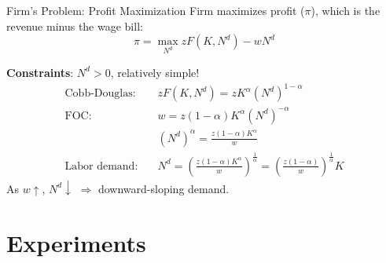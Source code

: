 \documentclass[11pt,aspectratio=169,usenames,dvipsnames]{beamer}
\let\tempone\itemize
\let\temptwo\enditemize
\renewenvironment{itemize}{\tempone\addtolength{\itemsep}{\fill}}{\temptwo}
\begin{document}
\begin{frame}{Firm's Problem: Profit Maximization}
\label{slide:Firm_s_Problem__Profit_Maximization}
Firm maximizes profit ($\pi$), which is the revenue minus the wage bill:
\begin{equation}
\label{eq:profit}
    \pi = \max_{N^{d}} z F( K, N^{d} ) - w N^{d}
\end{equation}
\begin{itemize}
    \item \textbf{Constraints}: $ N^{d} > 0 $, relatively simple!
        \begin{align}
            \text{Cobb-Douglas:} \quad
                & z F( K, N^{d} ) = z K^{\alpha} ( N^{d} )^{1-\alpha}
            \\
            \text{FOC:} \quad
                & w = z ( 1-\alpha ) K^{\alpha} ( N^{d} )^{-\alpha}
            \\
                & ( N^{d} )^{\alpha} = \frac{z ( 1-\alpha ) K^{\alpha}}{w}
            \\
            \text{Labor demand:} \quad
                & N^{d} = \left(
                    \frac{z ( 1-\alpha ) K^{\alpha}}{w}
                \right)^{\frac{1}{\alpha}}
                =
                \left(
                    \frac{z ( 1-\alpha ) }{w}
                \right)^{\frac{1}{\alpha}} K
        \end{align}
        As $ w \uparrow  $, $ N^{d} \downarrow  $ $ \Rightarrow  $ \alert{downward-sloping} demand.
\end{itemize}
\end{frame}

\section{Experiments}
\label{sec:Experiments}
\end{document}
